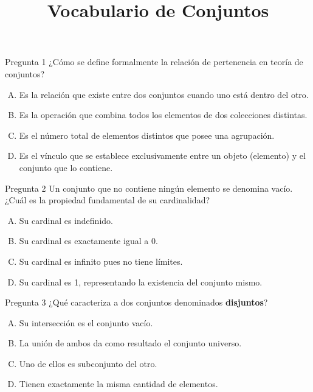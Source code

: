 \documentclass[aspectratio=169]{beamer}
\title{\Huge Vocabulario de Conjuntos}
\institute{\large\textbf{Objetivo de la clase:} \\[6pt]
Practicar vocabulario básico de Teoría de Conjuntos}
\date{}
\begin{document}

\begin{frame}
\titlepage  
\end{frame}

\begin{frame}[c]{}
\begin{block}{Pregunta 1}
\large
¿Cómo se define formalmente la relación de pertenencia en teoría de conjuntos?

\begin{enumerate}[A)]
    \item Es la relación que existe entre dos conjuntos cuando uno está dentro del otro.
    \item Es la operación que combina todos los elementos de dos colecciones distintas.
    \item Es el número total de elementos distintos que posee una agrupación.
    \item Es el vínculo que se establece exclusivamente entre un objeto (elemento) y el conjunto que lo contiene.
\end{enumerate}
\end{block}
\end{frame}
\begin{frame}
\begin{block}{Pregunta 2}
Un conjunto que no contiene ningún elemento se denomina vacío. ¿Cuál es la propiedad fundamental de su cardinalidad?

\begin{enumerate}[A)]
    \item Su cardinal es indefinido.
    \item Su cardinal es exactamente igual a 0.
    \item Su cardinal es infinito pues no tiene límites.
    \item Su cardinal es 1, representando la existencia del conjunto mismo.
\end{enumerate}
\end{block}
\end{frame}

\begin{frame}
\begin{block}{Pregunta 3}
¿Qué caracteriza a dos conjuntos denominados \textbf{disjuntos}?

\begin{enumerate}[A)]
    \item Su intersección es el conjunto vacío.
    \item La unión de ambos da como resultado el conjunto universo.
    \item Uno de ellos es subconjunto del otro.
    \item Tienen exactamente la misma cantidad de elementos.
\end{enumerate}
\end{block}
\end{frame}
\end{document}
